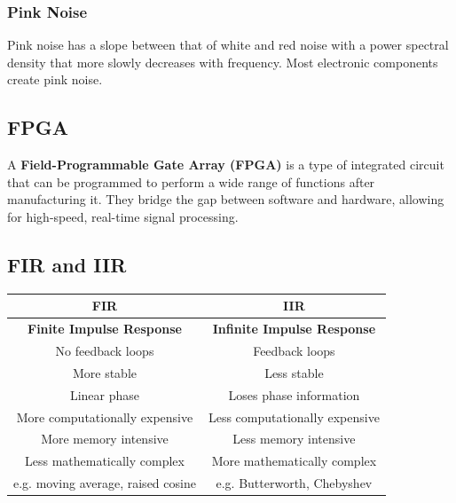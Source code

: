 \subsubsection{Pink Noise}

Pink noise has a slope between that of white and red noise with a power spectral density that more slowly decreases with frequency. Most electronic components create pink noise.

\subsection{FPGA}

A \textbf{Field-Programmable Gate Array (FPGA)} is a type of integrated circuit that can be programmed to perform a wide range of functions after manufacturing it. They bridge the gap between software and hardware, allowing for high-speed, real-time signal processing.

\subsection{FIR and IIR}

\begin{table}[H]
    \centering
    \begin{tabular}{cc}
        FIR                                & IIR                                \\
        \hline
        \hline
        \textbf{Finite Impulse Response}   & \textbf{Infinite Impulse Response} \\
        No feedback loops                  & Feedback loops                     \\
        More stable                        & Less stable                        \\
        Linear phase                       & Loses phase information            \\
        More computationally expensive     & Less computationally expensive     \\
        More memory intensive              & Less memory intensive              \\
        Less mathematically complex        & More mathematically complex        \\
        e.g. moving average, raised cosine & e.g. Butterworth, Chebyshev        \\
        \hline
    \end{tabular}
\end{table}

